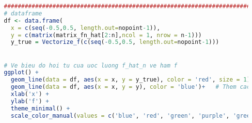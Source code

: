 \begin{lstlisting}[language=R, title = Phần 6: Ước lượng hàm hồi quy $f$ và vẽ hình minh họa]
#############################################################################
# dataframe
df <- data.frame(
  x = c(seq(-0.5,0.5, length.out=nopoint-1)),
  y = c(matrix(matrix_fn_hat[2:n],ncol = 1, nrow = n-1)))
  y_true = Vectorize_f(c(seq(-0.5,0.5, length.out=nopoint-1)))


# Ve bieu do hoi tu cua uoc luong f_hat_n ve ham f
ggplot() +  
  geom_line(data = df, aes(x = x, y = y_true), color = 'red', size = 1)+
  geom_line(data = df, aes(x = x, y = y), color = 'blue')+   # Them cac chi tiet cho bieu do
  xlab('x') +
  ylab('f') +
  theme_minimal() +
  scale_color_manual(values = c('blue', 'red', 'green', 'purple', 'green'))



\end{lstlisting}

